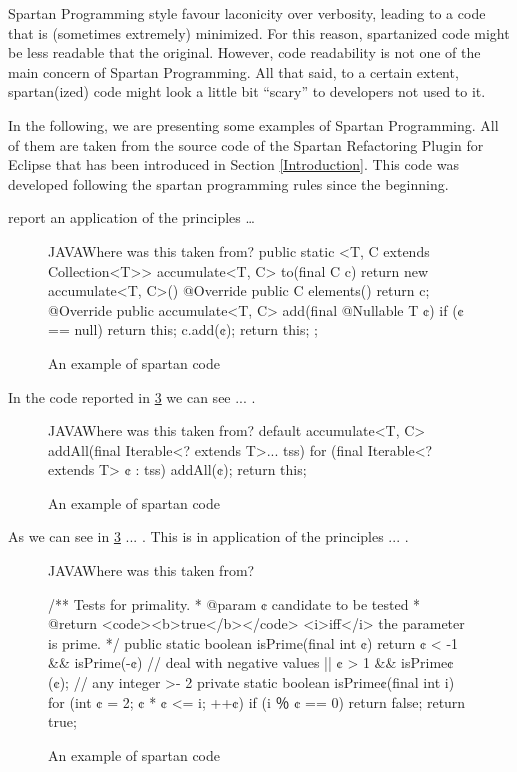 Spartan Programming style favour laconicity over verbosity, leading to 
a code that is (sometimes extremely) minimized. For this reason, spartanized code might 
be less readable that the original. However, code readability is not one of 
the main concern of Spartan Programming. All that said, to a certain extent, 
spartan(ized) code might look a little bit ``scary'' to developers not used to it.

In the following, we are presenting some examples of Spartan Programming.
All of them are taken from the source code of the Spartan Refactoring 
Plugin for Eclipse that has been introduced in Section \ref{Introduction}. 
This code was developed following the spartan programming rules since 
the beginning.

 report an application of the principles … 

\begin{figure}[ht]
\label{figure:first}
\caption{An example of spartan code}
  \begin{Code}{JAVA}{Where was this taken from?}
public static <T, C extends Collection<T>> accumulate<T, C> 
  to(final C c) {
    return new accumulate<T, C>() {
      @Override public C elements() {
        return c;
      }
      @Override public accumulate<T, C> 
        add(final @Nullable T ¢) {
          if (¢ == null)
            return this;
          c.add(¢);
          return this;
        }
    };
  }
\end{Code}
\end{figure}

In the code reported in \cref{figure:shock-2} we can see ... .

\begin{figure}[ht]
\label{figure:shock-2}
\caption{An example of spartan code}
\begin{Code}{JAVA}{Where was this taken from?}
default accumulate<T, C> 
    addAll(final Iterable<? extends T>... tss) {
      for (final Iterable<? extends T> ¢ : tss)
        addAll(¢);
      return this;
    }
\end{Code}

\end{figure}

As we can see in \cref{figure:shock-2} ... . This is 
in application of the principles ... .

\begin{figure}[ht]
\begin{Code}{JAVA}{Where was this taken from?}
\label{figure:shock-2}
\caption{An example of spartan code}
/** Tests for primality.
  * @param ¢ candidate to be tested
  * @return <code><b>true</b></code> <i>iff</i> the parameter is prime. */
public static boolean isPrime(final int ¢) {
  return ¢ < -1 && isPrime(-¢) // deal with negative values
      || ¢ > 1 && isPrime¢(¢); // any integer >- 2
}
private static boolean isPrime¢(final int i) {
  for (int ¢ = 2; ¢ * ¢ <= i; ++¢)
    if (i ％ ¢ == 0)
      return false;
  return true;
}
\end{Code}
\end{figure}

